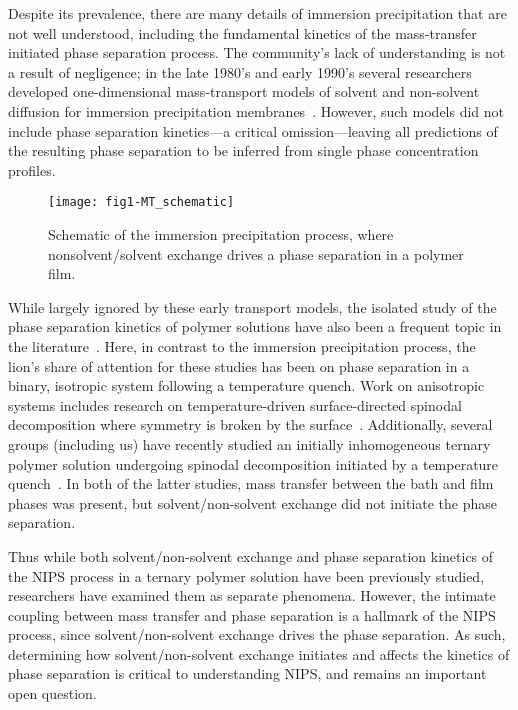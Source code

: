 \documentclass[journal=mamobx, layout=twocolumn]{achemso}
\begin{document}
Despite its prevalence, there are many details of immersion precipitation that are not well understood, including the fundamental kinetics of the mass-transfer initiated phase separation process.
The community's lack of understanding is not a result of negligence; in the late 1980's and early 1990's several researchers developed one-dimensional mass-transport models of solvent and non-solvent diffusion for immersion precipitation membranes~\cite{Reuvers1987,Tsay1990,Cheng1994}.
However, such models did not include phase separation kinetics---a critical omission---leaving all predictions of the resulting phase separation to be inferred from single phase concentration profiles.

\begin{figure}[tbp]
  \texttt{[image: fig1-MT\_schematic]}
  \caption{Schematic of the immersion precipitation process, where nonsolvent/solvent exchange drives a phase separation in a polymer film.}
  \label{fig-MT_schematic}
\end{figure}

While largely ignored by these early transport models, the isolated study of the phase separation kinetics of polymer solutions have also been a frequent topic in the literature~\cite{Barton1998, Chen1998a, Aksimentiev2000}.
Here, in contrast to the immersion precipitation process, the lion's share of attention for these studies has been on phase separation in a binary, isotropic system following a temperature quench.
Work on anisotropic systems includes research on temperature-driven surface-directed spinodal decomposition where symmetry is broken by the surface~\cite{Jones1991,Ball1990}.
Additionally, several groups (including us) have recently studied an initially inhomogeneous ternary polymer solution undergoing spinodal decomposition initiated by a temperature quench~\cite{Martys2001, Zhou2006, Tree2017, Cervellere2019}.
In both of the latter studies, mass transfer between the bath and film phases was present, but solvent/non-solvent exchange did not initiate the phase separation.

Thus while both solvent/non-solvent exchange and phase separation kinetics of the NIPS process in a ternary polymer solution have been previously studied, researchers have examined them as separate phenomena.
However, the intimate coupling between mass transfer and phase separation is a hallmark of the NIPS process, since solvent/non-solvent exchange drives the phase separation.
As such, determining how solvent/non-solvent exchange initiates and affects the kinetics of phase separation is critical to understanding NIPS, and remains an important open question.
\end{document}
